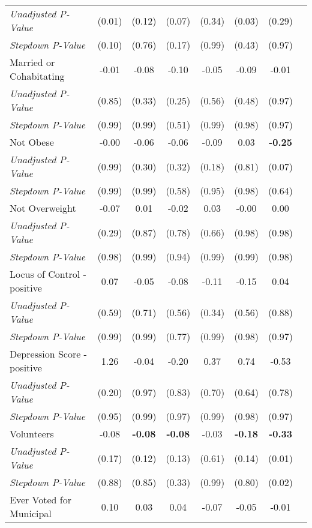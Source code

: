 \begin{tabular}{l c c c c c c c}
\quad \textit{Unadjusted P-Value} & (0.01) & (0.12) & (0.07) & (0.34) & (0.03) & (0.29) \\
\quad \textit{Stepdown P-Value} & (0.10) & (0.76) & (0.17) & (0.99) & (0.43) & (0.97) \\
Married or Cohabitating & -0.01 & -0.08 & -0.10 & -0.05 & -0.09 & -0.01 \\
\quad \textit{Unadjusted P-Value} & (0.85) & (0.33) & (0.25) & (0.56) & (0.48) & (0.97) \\
\quad \textit{Stepdown P-Value} & (0.99) & (0.99) & (0.51) & (0.99) & (0.98) & (0.97) \\
Not Obese & -0.00 & -0.06 & -0.06 & -0.09 & 0.03 & \textbf{ -0.25 } \\
\quad \textit{Unadjusted P-Value} & (0.99) & (0.30) & (0.32) & (0.18) & (0.81) & (0.07) \\
\quad \textit{Stepdown P-Value} & (0.99) & (0.99) & (0.58) & (0.95) & (0.98) & (0.64) \\
Not Overweight & -0.07 & 0.01 & -0.02 & 0.03 & -0.00 & 0.00 \\
\quad \textit{Unadjusted P-Value} & (0.29) & (0.87) & (0.78) & (0.66) & (0.98) & (0.98) \\
\quad \textit{Stepdown P-Value} & (0.98) & (0.99) & (0.94) & (0.99) & (0.99) & (0.98) \\
Locus of Control - positive & 0.07 & -0.05 & -0.08 & -0.11 & -0.15 & 0.04 \\
\quad \textit{Unadjusted P-Value} & (0.59) & (0.71) & (0.56) & (0.34) & (0.56) & (0.88) \\
\quad \textit{Stepdown P-Value} & (0.99) & (0.99) & (0.77) & (0.99) & (0.98) & (0.97) \\
Depression Score - positive & 1.26 & -0.04 & -0.20 & 0.37 & 0.74 & -0.53 \\
\quad \textit{Unadjusted P-Value} & (0.20) & (0.97) & (0.83) & (0.70) & (0.64) & (0.78) \\
\quad \textit{Stepdown P-Value} & (0.95) & (0.99) & (0.97) & (0.99) & (0.98) & (0.97) \\
Volunteers & -0.08 & \textbf{ -0.08 } & \textbf{ -0.08 } & -0.03 & \textbf{ -0.18 } & \textbf{ -0.33 } \\
\quad \textit{Unadjusted P-Value} & (0.17) & (0.12) & (0.13) & (0.61) & (0.14) & (0.01) \\
\quad \textit{Stepdown P-Value} & (0.88) & (0.85) & (0.33) & (0.99) & (0.80) & (0.02) \\
Ever Voted for Municipal & 0.10 & 0.03 & 0.04 & -0.07 & -0.05 & -0.01 \\

\end{tabular}
